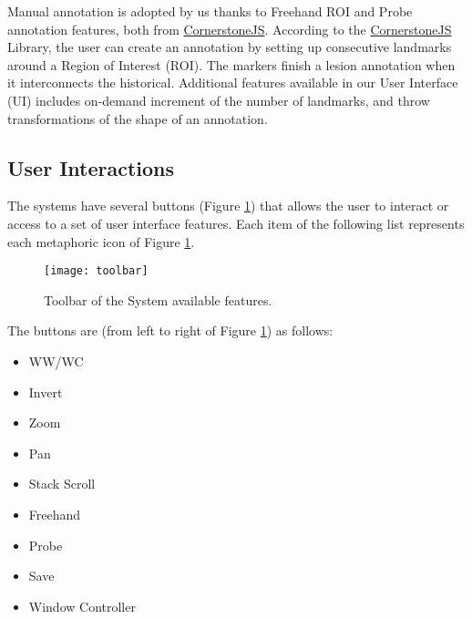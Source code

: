 \hfill


Manual annotation is adopted by us thanks to Freehand ROI and Probe annotation features, both from \hyperlink{https://cornerstonejs.org/}{CornerstoneJS}. According to the \hyperlink{https://cornerstonejs.org/}{CornerstoneJS} Library, the user can create an annotation by setting up consecutive landmarks around a Region of Interest (ROI). The markers finish a lesion annotation when it interconnects the historical. Additional features available in our User Interface (UI) includes on-demand increment of the number of landmarks, and throw transformations of the shape of an annotation.

\clearpage


\subsection{User Interactions}

The systems have several buttons (Figure \ref{fig:toolbar}) that allows the user to interact or access to a set of user interface features. Each item of the following list represents each metaphoric icon of Figure \ref{fig:toolbar}.


\hfill

\begin{figure}[h]
\centering
\texttt{[image: toolbar]}
\caption{Toolbar of the System available features.}
\label{fig:toolbar}
\end{figure}

\hfill


\hfill

The buttons are (from left to right of Figure \ref{fig:toolbar}) as follows:

\hfill

\begin{itemize}
\item WW/WC
\item Invert
\item Zoom
\item Pan
\item Stack Scroll
\item Freehand
\item Probe
\item Save
\item Window Controller
\end{itemize}

